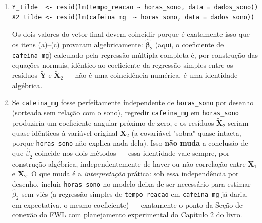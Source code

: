 \documentclass[11pt]{article}
\begin{document}
\begin{solucao}
\begin{enumerate}[label=(\alph*)]
$$    $$
    que é exatamente a fórmula de mínimos quadrados da regressão simples (sem intercepto, já que
    resíduos de uma regressão com intercepto em $\mathbf{X}_1$ já têm média zero) de
    $\tilde{\mathbf{Y}}$ em $\tilde{\mathbf{X}}_2$. \textbf{C.Q.D.}
  \item
\begin{lstlisting}
Y_tilde  <- resid(lm(tempo_reacao ~ horas_sono, data = dados_sono))
X2_tilde <- resid(lm(cafeina_mg  ~ horas_sono, data = dados_sono))
\end{lstlisting}
    Os dois valores do vetor final devem coincidir porque é exatamente isso que os itens
    (a)--(c) provaram algebricamente: $\hat{\boldsymbol\beta}_2$ (aqui, o coeficiente de
    \texttt{cafeina\_mg}) calculado pela regressão múltipla completa é, por construção das
    equações normais, idêntico ao coeficiente da regressão simples entre os resíduos
    $\tilde{\mathbf{Y}}$ e $\tilde{\mathbf{X}}_2$ --- não é uma coincidência numérica, é uma
    identidade algébrica.
  \item Se \texttt{cafeina\_mg} fosse perfeitamente independente de \texttt{horas\_sono} por
    desenho (sorteada sem relação com o sono), regredir \texttt{cafeina\_mg} em
    \texttt{horas\_sono} produziria um coeficiente angular próximo de zero, e os resíduos
    $\tilde{\mathbf{X}}_2$ seriam quase idênticos à variável original $\mathbf{X}_2$ (a
    covariável "sobra" quase intacta, porque \texttt{horas\_sono} não explica nada dela). Isso
    \textbf{não muda} a conclusão de que $\hat\beta_2$ coincide nos dois métodos --- essa
    identidade vale sempre, por construção algébrica, independentemente de haver ou não
    correlação entre $\mathbf{X}_1$ e $\mathbf{X}_2$. O que muda é a \emph{interpretação}
    prática: sob essa independência por desenho, incluir \texttt{horas\_sono} no modelo deixa de
    ser necessário para estimar $\hat\beta_2$ sem viés (a regressão simples de
    \texttt{tempo\_reacao} em \texttt{cafeina\_mg} já daria, em expectativa, o mesmo coeficiente)
    --- exatamente o ponto da Seção de conexão do FWL com planejamento experimental do Capítulo 2
    do livro.
\end{enumerate}
\end{solucao}
\end{document}
